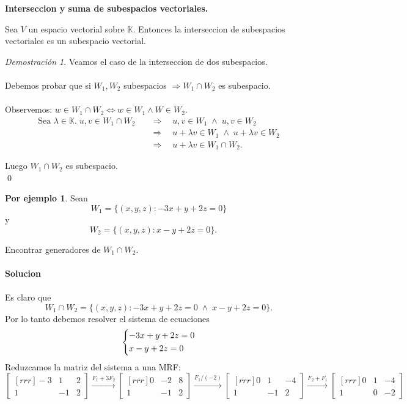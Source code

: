 \documentclass{article}
\theoremstyle{definition}
\theoremstyle{definition}
\newtheorem*{ej}{Por ejemplo}
\theoremstyle{remark}
\newtheorem*{demo}{Demostración}
\begin{document}
\begin{center}
\textbf{Interseccion y suma de subespacios vectoriales.}
\end{center}
\begin{teo}
Sea $V$ un espacio vectorial sobre $\mathbb{K}$. Entonces la interseccion de subespacios vectoriales es un subespacio vectorial.
\end{teo}
\begin{demo}
  Veamos el caso de la interseccion de dos subespacios. \\\\ Debemos probar que si $W_1,W_2$ subespacios $\Rightarrow W_1 \cap W_2$ es subespacio. \\\\ 
  Observemos: $w \in W_1 \cap W_2 \Leftrightarrow w \in W_1 \land W \in W_2$. \[
    \begin{aligned}
      \text{Sea } \lambda \in \mathbb{K}.\; u,v \in W_1 \cap W_2 \quad &\Rightarrow\quad u,v \in W_1 \; \land \; u,v \in W_2 \\ 
                                                               &\Rightarrow\quad u+\lambda v \in W_1 \; \land \; u+\lambda v \in W_2 \\
                                                               &\Rightarrow\quad  u+\lambda v \in W_1 \cap W_2 .
    \end{aligned}
  \]
\end{demo}
Luego $W_1 \cap W_2$ es subespacio. \\ \qed
\begin{ej}
 Sean \[
   W_1=\{(x,y,z) : -3x+y+2z=0\}
 \]
 y
 \[
   W_2=\{(x,y,z):x-y+2z=0\}.\phantom{-1}
 \]
\end{ej}
Encontrar generadores de $W_1 \cap W_2$. \\\\
\textbf{Solucion} \\\\ Es claro que \[
  W_1\cap W_2 = \{(x,y,z): -3x+y+2z=0 \; \land \; x-y+2z=0\}.
\]
Por lo tanto debemos resolver el sistema de ecuaciones \[
  \begin{dcases}
    -3x+y+2z=0 \\
    x-y+2z=0 
  \end{dcases}
\]
Reduzcamos la matriz del sistema a una MRF: \[
  \begin{bmatrix}[rrr]-3&1 &2 \\ 1 & -1 & 2 \end{bmatrix} \xrightarrow{F_1+3F_2}\begin{bmatrix}[rrr]0 & -2 & 8 \\ 1 & -1 & 2 \end{bmatrix} \xrightarrow{F_1 / (-2)} \begin{bmatrix}[rrr]0 & 1 & -4 \\ 1 & -1 & 2 \end{bmatrix} \xrightarrow{F_2+F_1} \begin{bmatrix}[rrr]0 & 1 & -4 \\ 1 & 0 & -2 \end{bmatrix}
\]
\end{document}

